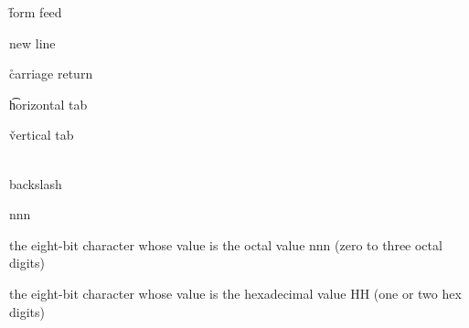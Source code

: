 {\f

form feed

\n

new line

\r

carriage return

\t

horizontal tab

\v

vertical tab

\\

backslash

\0nnn

the eight-bit character whose value is the octal value nnn (zero to three octal digits)

\xHH

the eight-bit character whose value is the hexadecimal value HH (one or two hex digits)

}
